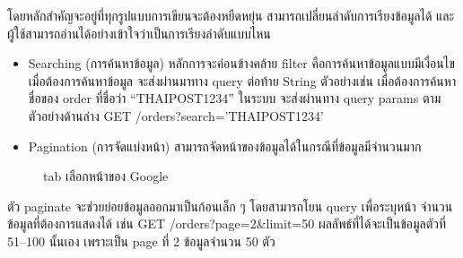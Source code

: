 \documentclass[14pt,oneside,openright,a4paper]{cpe-thai-project}
\begin{document}
\begin{enumerate}
\begin{itemize}
      \end{itemize}

โดยหลักสำคัญจะอยู่ที่ทุกรูปแบบการเขียนจะต้องหยืดหยุ่น สามารถเปลี่ยนลำดับการเรียงข้อมูลได้ และผู้ใช้สามารถอ่านได้อย่างเข้าใจว่าเป็นการเรียงลำดับแบบไหน

          \begin{itemize} 
            \item Searching (การค้นหาข้อมูล) หลักการจะค่อนข้างคล้าย filter คือการค้นหาข้อมูลแบบมีเงื่อนไข เมื่อต้องการค้นหาข้อมูล จะส่งผ่านมาทาง query ต่อท้าย String ตัวอย่างเช่น เมื่อต้องการค้นหาชื่อของ order ที่ชื่อว่า “THAIPOST1234” ในระบบ จะส่งผ่านทาง query params ตามตัวอย่างด้านล่าง
              GET /orders?search='THAIPOST1234' \\ 
            \item Pagination (การจัดแบ่งหน้า) \cite{Pagination} สามารถจัดหน้าของข้อมูลได้ในกรณีที่ข้อมูลมีจำนวนมาก
          \end{itemize}

            \begin{figure}[!h]\centering
              \setlength{\fboxrule}{0.5mm} %
              \setlength{\fboxsep}{0.5cm}
              \caption{tab เลือกหน้าของ Google}\label{fig:google}
            \end{figure}

ตัว paginate จะช่วยย่อยข้อมูลออกมาเป็นก้อนเล็ก ๆ โดยสามารถโยน query เพื่อระบุหน้า จำนวนข้อมูลที่ต้องการแสดงได้ เช่น GET /orders?page=2\&limit=50
ผลลัพธ์ที่ได้จะเป็นข้อมูลตัวที่ 51–100 นั้นเอง เพราะเป็น page ที่ 2 ข้อมูลจำนวน 50 ตัว


\end{enumerate}
\end{document}
